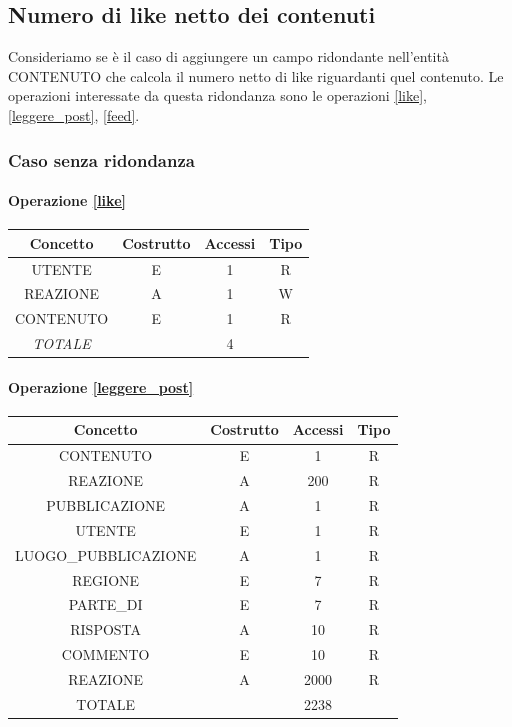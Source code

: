 \documentclass[a4paper,12pt]{report}
\begin{document}
\subsection{Numero di like netto dei contenuti}
Consideriamo se è il caso di aggiungere un campo ridondante nell'entità CONTENUTO che calcola il numero netto di like riguardanti quel contenuto. Le operazioni interessate da questa ridondanza sono le operazioni \ref{like}, \ref{leggere_post}, \ref{feed}.
\subsubsection{Caso senza ridondanza}
\begin{table}[H]
\paragraph{Operazione \ref{like}\newline}
\begin{tabular}{|c|c|c|c|}
\hline
Concetto        & Costrutto & Accessi & Tipo \\ \hline
UTENTE          & E         & 1       & R    \\ \hline
REAZIONE        & A         & 1       & W    \\ \hline
CONTENUTO       & E         & 1       & R    \\ \hline
\textit{TOTALE} &           & 4       &      \\ \hline
\end{tabular}
\end{table}
\begin{table}[H]
\paragraph{Operazione \ref{leggere_post}\newline}
\begin{tabular}{|c|c|c|c|}
\hline
Concetto             & Costrutto & Accessi & Tipo \\ \hline
CONTENUTO            & E         & 1       & R    \\ \hline
REAZIONE             & A         & 200     & R    \\ \hline
PUBBLICAZIONE        & A         & 1       & R    \\ \hline
UTENTE               & E         & 1       & R    \\ \hline
LUOGO\_PUBBLICAZIONE & A         & 1       & R    \\ \hline
REGIONE              & E         & 7       & R    \\ \hline
PARTE\_DI            & E         & 7       & R    \\ \hline
RISPOSTA             & A         & 10      & R    \\ \hline
COMMENTO             & E         & 10      & R    \\ \hline
REAZIONE             & A         & 2000    & R    \\ \hline
TOTALE               &           & 2238    &      \\ \hline
\end{tabular}
\end{table}
\end{document}
